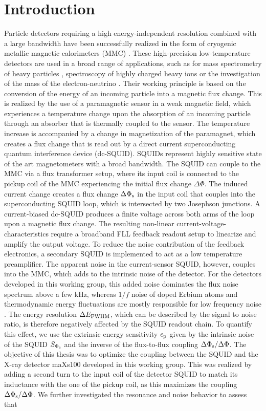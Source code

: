 \chapter{Introduction}

Particle detectors requiring a high energy-independent resolution combined with a large bandwidth have been successfully realized in the form of cryogenic metallic magnetic calorimeters (MMC) \cite{Enss2005a}. These high-precision low-temperature detectors are used in a broad range of applications, such as for mass spectrometry of heavy particles \cite{Hengstler2017}, spectroscopy of highly charged heavy ions \cite{Gamer2919} or the investigation of the mass of the electron-neutrino \cite{Gastaldo2017}. Their working principle is based on the conversion of the energy of an incoming particle into a magnetic flux change. This is realized by the use of a paramagnetic sensor in a weak magnetic field, which experiences a temperature change upon the absorption of an incoming particle through an absorber that is thermally coupled to the sensor. The temperature increase is accompanied by a change in magnetization of the paramagnet, which creates a flux change that is read out by a direct current superconducting quantum interference device (dc-SQUID). SQUIDs represent highly sensitive state of the art magnetometers with a broad bandwidth. The SQUID can couple to the MMC via a flux transformer setup, where its input coil is connected to the pickup coil of the MMC experiencing the initial flux change $\Delta\Phi$. The induced current change creates a flux change $\Delta\Phi_{\rm s}$ in the input coil that couples into the superconducting SQUID loop, which is intersected by two Josephson junctions. A current-biased dc-SQUID produces a finite voltage across both arms of the loop upon a magnetic flux change. The resulting non-linear current-voltage-characteristics require a broadband FLL feedback readout setup to linearize and amplify the output voltage. To reduce the noise contribution of the feedback electronics, a secondary SQUID is implemented to act as a low temperature preamplifier. The apparent noise in the current-sensor SQUID, however, couples into the MMC, which adds to the intrinsic noise of the detector. For the detectors developed in this working group, this added noise dominates the flux noise spectrum above a few kHz, whereas $1/f$ noise of doped Erbium atoms and thermodynamic energy fluctuations are mostly responsible for low frequency noise \cite{Kempf2018}. The energy resolution $\Delta E_{\rm FWHM}$, which can be described by the signal to noise ratio, is therefore negatively affected by the SQUID readout chain. To quantify this effect, we use the extrinsic energy sensitivity $\epsilon_{\rm p}$ given by the intrinsic noise of the SQUID $S_{\Phi_{\rm s}}$ and the inverse of the flux-to-flux coupling $\Delta\Phi_{\rm s}/\Delta\Phi$. The objective of this thesis was to optimize the coupling between the SQUID and the X-ray detector maXs100 developed in this working group. This was realized by adding a second turn to the input coil of the detector SQUID to match its inductance with the one of the pickup coil, as this maximizes the coupling  $\Delta\Phi_{\rm s}/\Delta\Phi$. We further investigated the resonance and noise behavior to assess that 